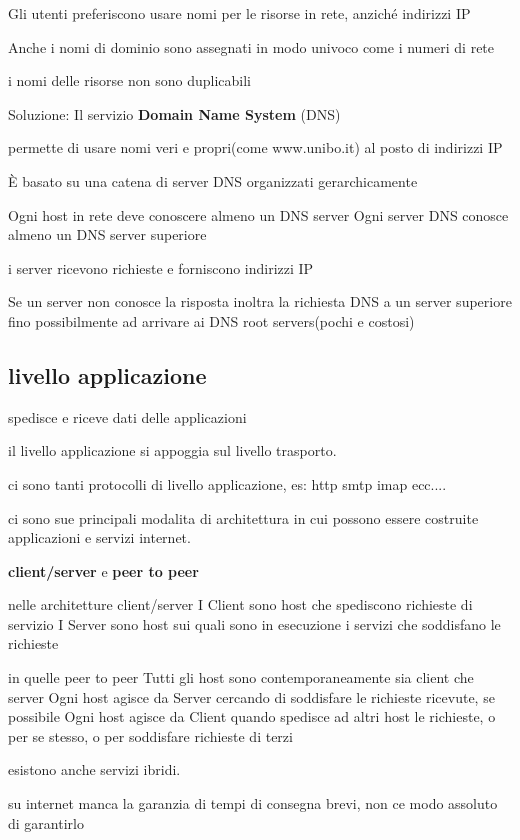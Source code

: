 \documentclass[12pt]{article}
\begin{document}
Gli utenti preferiscono usare nomi per le risorse in rete, anziché indirizzi IP

Anche i nomi di dominio sono assegnati in modo univoco come i numeri di rete

i nomi delle risorse non sono duplicabili

Soluzione: Il servizio \textbf{Domain Name System} (DNS)

permette di usare nomi veri e propri(come www.unibo.it) al posto di indirizzi IP

È basato su una catena di server DNS organizzati gerarchicamente

Ogni host in rete deve conoscere almeno un DNS server
Ogni server DNS conosce almeno un DNS server superiore

i server ricevono richieste e forniscono indirizzi IP

Se un server non conosce la risposta inoltra la richiesta DNS a un server superiore fino possibilmente ad arrivare ai DNS root servers(pochi e costosi)


\subsection{livello applicazione}

spedisce e riceve dati delle applicazioni

il livello applicazione si appoggia sul livello trasporto.

ci sono tanti protocolli di livello applicazione, es: http smtp imap ecc....



ci sono sue principali modalita di architettura in cui possono essere costruite applicazioni e servizi internet.

\textbf{client/server} e \textbf{peer to peer}

nelle architetture client/server
I Client sono host che spediscono richieste di servizio
I Server sono host sui quali sono in esecuzione i servizi che soddisfano le richieste

in quelle peer to peer
Tutti gli host sono contemporaneamente sia client che server
Ogni host agisce da Server cercando di soddisfare le richieste ricevute, se possibile
Ogni host agisce da Client quando spedisce ad altri host le richieste, o per se stesso, o
per soddisfare richieste di terzi

esistono anche servizi ibridi.

su internet manca la garanzia di tempi di consegna brevi, non ce modo assoluto di garantirlo
\end{document}
